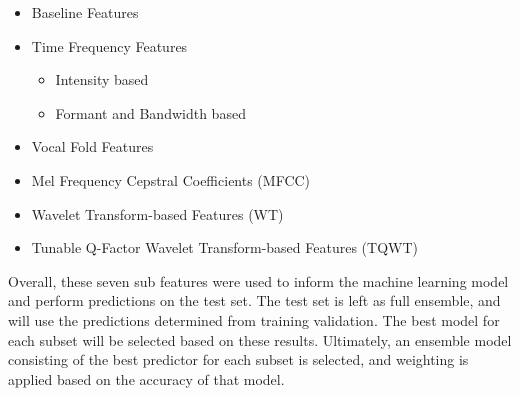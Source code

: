 \documentclass[
]{article}
\providecommand{\tightlist}{%
  \setlength{\itemsep}{0pt}\setlength{\parskip}{0pt}}
\begin{document}
\begin{itemize}
\tightlist
\item
  Baseline Features
\item
  Time Frequency Features

  \begin{itemize}
  \tightlist
  \item
    Intensity based
  \item
    Formant and Bandwidth based
  \end{itemize}
\item
  Vocal Fold Features
\item
  Mel Frequency Cepstral Coefficients (MFCC)
\item
  Wavelet Transform-based Features (WT)
\item
  Tunable Q-Factor Wavelet Transform-based Features (TQWT)
\end{itemize}

Overall, these seven sub features were used to inform the machine learning model and perform predictions on the test set. The test set is left as full ensemble, and will use the predictions determined from training validation. The best model for each subset will be selected based on these results. Ultimately, an ensemble model consisting of the best predictor for each subset is selected, and weighting is applied based on the accuracy of that model.
\end{document}
